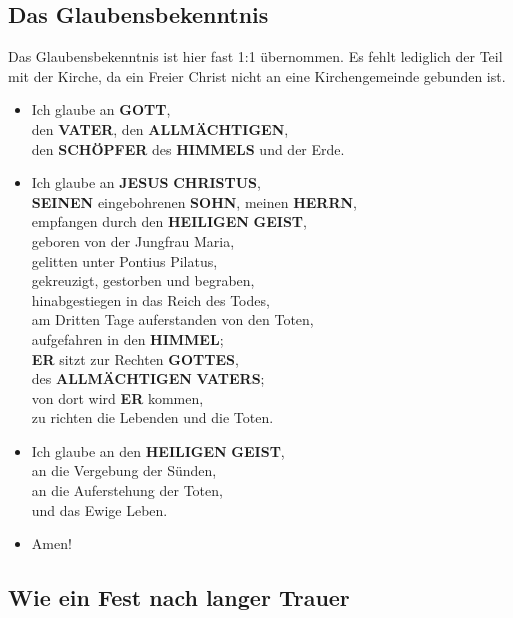 \documentclass[10pt,a5paper]{article}
\newcommand{\Allmaechtigen}[0]{\textbf{ALLM\"ACHTIGEN}}
\newcommand{\Christus}[0]{\textbf{CHRISTUS}}
\newcommand{\Er}[0]{\textbf{ER}}
\newcommand{\Geist}[0]{\textbf{GEIST}}
\newcommand{\Gottes}[0]{\textbf{GOTTES}}
\newcommand{\Gott}[0]{\textbf{GOTT}}
\newcommand{\Heiligen}[0]{\textbf{HEILIGEN}}
\newcommand{\Herrn}[0]{\textbf{HERRN}}
\newcommand{\Himmel}[0]{\textbf{HIMMEL}}
\newcommand{\Himmels}[0]{\textbf{HIMMELS}}
\newcommand{\Jesus}[0]{\textbf{JESUS}}
\newcommand{\Schoepfer}[0]{\textbf{SCH\"OPFER}}
\newcommand{\Seinen}[0]{\textbf{SEINEN}}
\newcommand{\Sohn}[0]{\textbf{SOHN}}
\newcommand{\Vater}[0]{\textbf{VATER}}
\newcommand{\Vaters}[0]{\textbf{VATERS}}
\begin{document}
	\subsection{Das Glaubensbekenntnis}
		Das Glaubensbekenntnis ist hier fast 1:1 \"ubernommen.
		Es fehlt lediglich der Teil mit der Kirche,
		da ein Freier Christ nicht an eine Kirchengemeinde gebunden ist.
		\\
		\begin{itemize}[nosep]
			\item	Ich glaube an {\Gott},
					\\
					den {\Vater},
					den {\Allmaechtigen},
					\\
					den {\Schoepfer} des {\Himmels} und der Erde.
			\item	Ich glaube an {\Jesus} {\Christus},
					\\
					{\Seinen} eingebohrenen {\Sohn},
					meinen {\Herrn},
					\\
					empfangen durch den {\Heiligen} {\Geist},
					\\
					geboren von der Jungfrau Maria,
					\\
					gelitten unter Pontius Pilatus,
					\\
					gekreuzigt,
					gestorben und begraben,
					\\
					hinabgestiegen in das Reich des Todes,
					\\
					am Dritten Tage auferstanden von den Toten,
					\\
					aufgefahren in den {\Himmel};
					\\
					{\Er} sitzt zur Rechten {\Gottes},
					\\
					des {\Allmaechtigen} {\Vaters};
					\\
					von dort wird {\Er} kommen,
					\\
					zu richten die Lebenden und die Toten.
			\item	Ich glaube an den {\Heiligen} {\Geist},
					\\
					an die Vergebung der S\"unden,
					\\
					an die Auferstehung der Toten,
					\\
					und das Ewige Leben.
			\item	Amen!
		\end{itemize}
		
	\subsection{Wie ein Fest nach langer Trauer}
\end{document}
